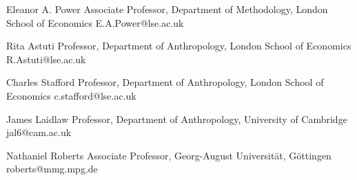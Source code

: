 

\begin{cvreferences}

  \cvreference
    {Eleanor A. Power} %
    {Associate Professor, Department of Methodology, London School of Economics} %
    {E.A.Power@lse.ac.uk}

  \cvreference
    {Rita Astuti} %
    {Professor, Department of Anthropology, London School of Economics} %
    {R.Astuti@lse.ac.uk}



  \cvreference
    {Charles Stafford} %
    {Professor, Department of Anthropology, London School of Economics} %
    {c.stafford@lse.ac.uk}


\end{cvreferences}

\newpage
{}

\begin{cvreferences}

  \cvreference
    {James Laidlaw} %
    {Professor, Department of Anthropology, University of Cambridge} %
    {jal6@cam.ac.uk}

  \cvreference
    {Nathaniel Roberts} %
    {Associate Professor, Georg-August Universität, Göttingen} %
    {roberts@mmg.mpg.de}

\end{cvreferences}

